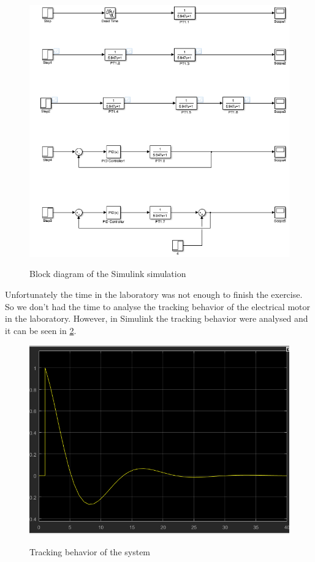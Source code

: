 \begin{figure}
    \centering
    \includegraphics[width=\linewidth]{simulink.png}
    \label{simulink}
    \caption{Block diagram of the Simulink simulation}
\end{figure}

Unfortunately the time in the laboratory was not enough to finish the exercise. So we don't had the time to analyse the tracking behavior of the electrical motor in the laboratory. However, in Simulink the tracking behavior were analysed and it can be seen in \ref{tracking}.

\begin{figure}[h!]
    \centering
    \includegraphics[width=\linewidth]{slope_tracking.png}
    \label{tracking}
    \caption{Tracking behavior of the system}
\end{figure}
